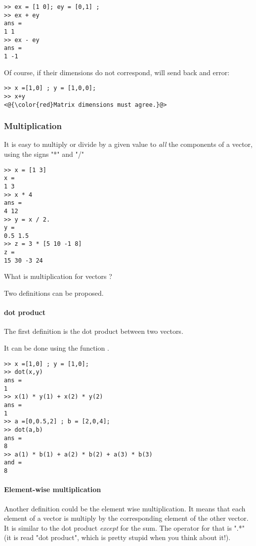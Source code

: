 \begin{lstlisting}
>> ex = [1 0]; ey = [0,1] ;
>> ex + ey
ans =
1 1
>> ex - ey
ans =
1 -1
\end{lstlisting}

Of course, if their dimensions do not correspond, \matlab will send back and error:

\begin{lstlisting}
>> x =[1,0] ; y = [1,0,0];
>> x+y
<@{\color{red}Matrix dimensions must agree.}@>
\end{lstlisting}







\subsubsection{Multiplication}
It is easy to multiply or divide by a given value to \emph{all} the components of a vector, using the signs "*" and "/"

\begin{lstlisting}
>> x = [1 3]
x = 
1 3
>> x * 4
ans =
4 12
>> y = x / 2.
y =
0.5 1.5
>> z = 3 * [5 10 -1 8]
z = 
15 30 -3 24
\end{lstlisting}

What is multiplication for vectors ?

Two definitions can be proposed.

\paragraph{dot product}
The first definition is the dot product between two vectors.


It can be done using the function .
\begin{lstlisting}
>> x =[1,0] ; y = [1,0];
>> dot(x,y)
ans = 
1
>> x(1) * y(1) + x(2) * y(2)
ans =
1
>> a =[0,0.5,2] ; b = [2,0,4];
>> dot(a,b)
ans = 
8
>> a(1) * b(1) + a(2) * b(2) + a(3) * b(3)    
and =
8
\end{lstlisting}


\paragraph{Element-wise multiplication}
Another definition could be the element wise multiplication.
It means that each element of a vector is multiply by the corresponding element of the other vector.
It is similar to the dot product \emph{except} for the sum.
The operator for that is ".*" (it is read "dot product", which is pretty stupid when you think about it!).

